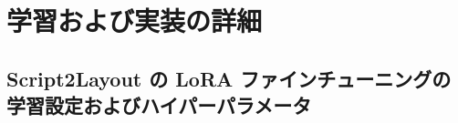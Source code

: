 \documentclass[a4j,12pt,dvipdfmx]{jsreport}
\begin{document}
\ifdefined\ismain\else
  \pagestyle{fancy}
  \lhead{\rightmark}
  \renewcommand{\chaptermark}[1]{\markboth{第\ \thechapter\ 章\ #1}{}}
  \setlength{\headheight}{16.5pt}
  \titleformat{\chapter}[hang]{\LARGE\bfseries}{\prechaptername\thechapter\postchaptername}{1em}{}
\fi
\chapter{学習および実装の詳細}
\label{app:training}

\section{Script2Layout の LoRA ファインチューニングの学習設定およびハイパーパラメータ}
\label{app:script2layout_hyperparams}
\end{document}
